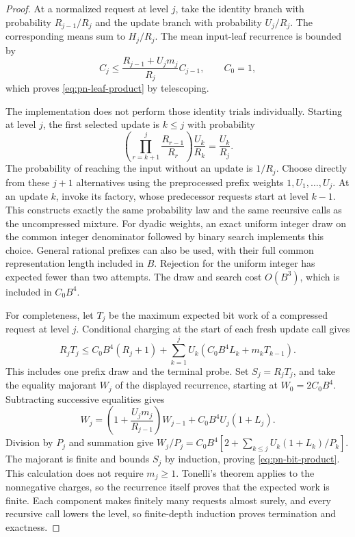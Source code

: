 \begin{proof}
At a normalized request at level $j$, take the identity branch with
probability $R_{j-1}/R_j$ and the update branch with probability $U_j/R_j$.
The corresponding means sum to $H_j/R_j$. The mean input-leaf recurrence
is bounded by
\[
 C_j\le
 \frac{R_{j-1}+U_jm_j}{R_j}C_{j-1},\qquad C_0=1,
\]
which proves \eqref{eq:pn-leaf-product} by telescoping.

The implementation does not perform those identity trials individually.
Starting at level $j$, the first selected update is $k\le j$ with
probability
\[
 \left(\prod_{r=k+1}^j\frac{R_{r-1}}{R_r}\right)
       \frac{U_k}{R_k}=\frac{U_k}{R_j}.
\]
The probability of reaching the input without an update is $1/R_j$.
Choose directly from these $j+1$ alternatives using the preprocessed
prefix weights $1,U_1,\ldots,U_j$. At an update $k$, invoke its factory,
whose predecessor requests start at level $k-1$. This constructs exactly
the same probability law and the same recursive calls as the uncompressed
mixture. For dyadic weights, an exact uniform integer draw on the common
integer denominator followed by binary search implements this choice.
General rational prefixes can also be used, with their full common
representation length included in $B$. Rejection for the uniform integer
has expected fewer than two attempts. The draw and search cost $O(B^3)$,
which is included in $C_0B^4$.

For completeness, let $T_j$ be the maximum expected bit work of a
compressed request at level $j$. Conditional charging at
the start of each fresh update call gives
\[
 R_jT_j\le C_0B^4(R_j+1)
    +\sum_{k=1}^jU_k
       \left(C_0B^4L_k+m_kT_{k-1}\right).
\]
This includes one prefix draw and the terminal probe. Set $S_j=R_jT_j$,
and take the equality majorant $W_j$ of the displayed recurrence,
starting at $W_0=2C_0B^4$. Subtracting successive equalities gives
\[
 W_j=\left(1+\frac{U_jm_j}{R_{j-1}}\right)W_{j-1}
       +C_0B^4U_j(1+L_j).
\]
Division by $P_j$ and summation give
$W_j/P_j=C_0B^4[2+\sum_{k\le j}U_k(1+L_k)/P_k]$.
The majorant is finite and bounds $S_j$ by induction, proving
\eqref{eq:pn-bit-product}. This calculation does not require $m_j\ge1$.
Tonelli's theorem applies to the
nonnegative charges, so the recurrence itself proves that the expected
work is finite. Each component makes finitely many requests
almost surely, and every recursive call lowers the level, so finite-depth
induction proves termination and exactness.


\end{proof}
